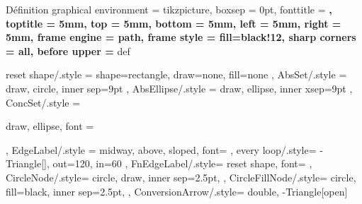 \let\hspaceThis\hphantom


\newcommand{\appref}[1]{Appendix \ref{#1}}
\newcommand{\fnref}[1]{Footnote \ref{#1}}
\renewcommand{\sectref}[1]{section~\ref{#1}}

\newcommand*{\Boite}{\bgroup\normalfont\ttfamily ▢\egroup}


\newcommand*{\FurtherReading}[1]
  {%
    \vskip\baselineskip
    \begin{refsection}
    \nocite{*}
    \printbibliography[heading=none,keyword={Ch-#1}]
    \end{refsection}
  }

  {Définition}
  { 
    graphical environment = tikzpicture,
    boxsep = 0pt,
    fonttitle = \normalsize\sffamily\bfseries,
    toptitle = 5mm,
    top = 5mm,
    bottom = 5mm,
    left = 5mm,
    right = 5mm,
    frame engine = path,
    frame style = {fill=black!12},
    sharp corners = all,
    before upper = {\hspace*{-\parindent}}
  }
  {def}


\newcommand{\Definition}[2]{%
  \begin{definition}{#1}{}
  #2
  \end{definition}%
}

\newfontfamily{}

\setlength{\epigraphwidth}{.618\textwidth}%
\tikzset
  {
    reset shape/.style = {
      shape=rectangle,
      draw=none,
      fill=none
    },
    AbsSet/.style = {
      draw,
      circle,
      inner sep=9pt
    },
    AbsEllipse/.style ={
      draw,
      ellipse,
      inner xsep=9pt
    },
    ConcSet/.style = {
      draw,
      ellipse,
      font = {\itshape\strut}
    },
    EdgeLabel/.style = {
      midway,
      above,
      sloped,
      font=\small
    },
    every loop/.style={
        -{Triangle[]},
        out=120,
        in=60
    },
    FnEdgeLabel/.style={
      reset shape,
      font=\footnotesize
    },
    CircleNode/.style={
      circle, 
      draw,
      inner sep=2.5pt,
    },
    CircleFillNode/.style={
      circle, 
      fill=black,
      inner sep=2.5pt,
    },
    ConversionArrow/.style={
      double, 
      -{Triangle[open]}
    }
  }%


